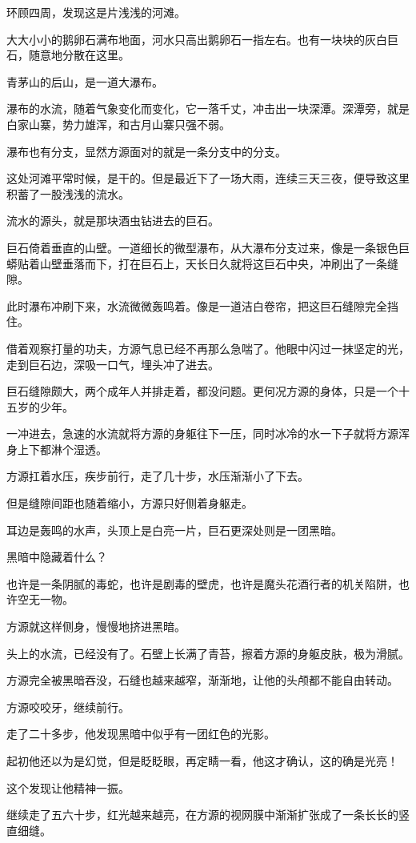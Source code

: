 \begin{this_body}
环顾四周，发现这是片浅浅的河滩。

大大小小的鹅卵石满布地面，河水只高出鹅卵石一指左右。也有一块块的灰白巨石，随意地分散在这里。

青茅山的后山，是一道大瀑布。

瀑布的水流，随着气象变化而变化，它一落千丈，冲击出一块深潭。深潭旁，就是白家山寨，势力雄浑，和古月山寨只强不弱。

瀑布也有分支，显然方源面对的就是一条分支中的分支。

这处河滩平常时候，是干的。但是最近下了一场大雨，连续三天三夜，便导致这里积蓄了一股浅浅的流水。

流水的源头，就是那块酒虫钻进去的巨石。

巨石倚着垂直的山壁。一道细长的微型瀑布，从大瀑布分支过来，像是一条银色巨蟒贴着山壁垂落而下，打在巨石上，天长日久就将这巨石中央，冲刷出了一条缝隙。

此时瀑布冲刷下来，水流微微轰鸣着。像是一道洁白卷帘，把这巨石缝隙完全挡住。

借着观察打量的功夫，方源气息已经不再那么急喘了。他眼中闪过一抹坚定的光，走到巨石边，深吸一口气，埋头冲了进去。

巨石缝隙颇大，两个成年人并排走着，都没问题。更何况方源的身体，只是一个十五岁的少年。

一冲进去，急速的水流就将方源的身躯往下一压，同时冰冷的水一下子就将方源浑身上下都淋个湿透。

方源扛着水压，疾步前行，走了几十步，水压渐渐小了下去。

但是缝隙间距也随着缩小，方源只好侧着身躯走。

耳边是轰鸣的水声，头顶上是白亮一片，巨石更深处则是一团黑暗。

黑暗中隐藏着什么？

也许是一条阴腻的毒蛇，也许是剧毒的壁虎，也许是魔头花酒行者的机关陷阱，也许空无一物。

方源就这样侧身，慢慢地挤进黑暗。

头上的水流，已经没有了。石壁上长满了青苔，擦着方源的身躯皮肤，极为滑腻。

方源完全被黑暗吞没，石缝也越来越窄，渐渐地，让他的头颅都不能自由转动。

方源咬咬牙，继续前行。

走了二十多步，他发现黑暗中似乎有一团红色的光影。

起初他还以为是幻觉，但是眨眨眼，再定睛一看，他这才确认，这的确是光亮！

这个发现让他精神一振。

继续走了五六十步，红光越来越亮，在方源的视网膜中渐渐扩张成了一条长长的竖直细缝。


\end{this_body}
